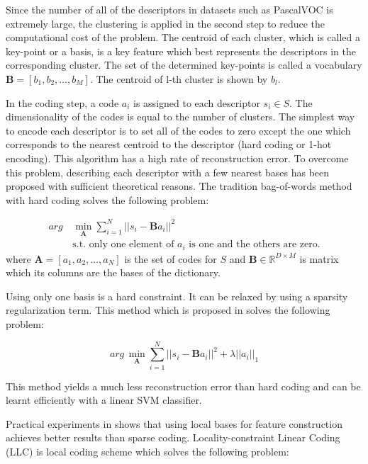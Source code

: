 \documentclass[a4paper,12pt]{article}
\begin{document}
Since the number of all of the descriptors in datasets such as PascalVOC is extremely large, the clustering is applied in the second step to reduce the computational cost of the problem. The centroid of each cluster, which is called a key-point or a basis, is a key feature which best represents the descriptors in the corresponding cluster. The set of the determined key-points is called a vocabulary $\mathbf{B} = [b_1,b_2,\ldots,b_M]$. The centroid of l-th cluster is shown by $b_l$.

In the coding step, a code $a_i$ is assigned to each descriptor $s_i \in S$. The dimensionality of the codes is equal to the number of clusters. The simplest way to encode each descriptor is to set all of the codes to zero except the one which corresponds to the nearest centroid to the descriptor (hard coding or 1-hot encoding). This algorithm has a high rate of reconstruction error. To overcome this problem, describing each descriptor with a few nearest bases has been proposed with sufficient theoretical reasons. The tradition bag-of-words method with hard coding solves the following problem:

\begin{align}
arg\,&\min_{\mathbf{A}} \sum_{i=1}^{N} || s_i - \mathbf{B}a_i ||^{2} \\
 & \text{s.t. only one element of $a_i$ is one and the others are zero.} \nonumber
\end{align}
where $\mathbf{A} = [a_1,a_2,\ldots,a_N]$ is the set of codes for $S$ and $\mathbf{B} \in \mathbb{R}^{D \times M}$ is matrix which its columns are the bases of the dictionary. 

Using only one basis is a hard constraint. It can be relaxed by using a sparsity regularization term. This method which is proposed in \cite{LLC22} solves the following problem:

\begin{equation}
arg\,\min_{\mathbf{A}} \sum_{i=1}^{N} || s_i - \mathbf{B}a_i ||^{2} + \lambda||a_i||_{1} 
\end{equation}

This method yields a much less reconstruction error than hard coding and can be learnt efficiently with a linear SVM classifier.

Practical experiments in \cite{shaban21} shows that using local bases for feature construction achieves better results than sparse coding. Locality-constraint Linear Coding (LLC) \cite{shaban6} is local coding scheme which solves the following problem:
\end{document}
